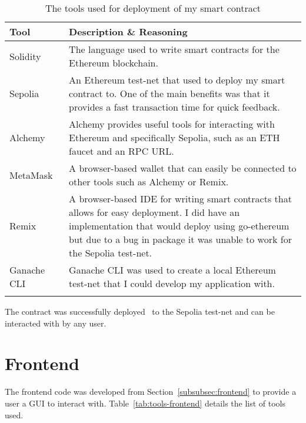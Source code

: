 \begin{longtable}{p{} p{}}
  \toprule
  \textbf{Tool} & \textbf{Description \& Reasoning}
  \\\midrule\midrule
  Solidity~\cite{noauthor_solidity_nodate}
  & The language used to write smart contracts for the Ethereum blockchain.\\
  Sepolia~\cite{noauthor_sepolia_nodate}
  & An Ethereum test-net that used to deploy my smart contract to. One of the main benefits was that it provides a fast transaction time for quick feedback.\\
  Alchemy~\cite{noauthor_alchemy_nodate}
  & Alchemy provides useful tools for interacting with Ethereum and specifically Sepolia, such as an ETH faucet and an RPC URL.\\
  MetaMask~\cite{noauthor_crypto_nodate}
  & A browser-based wallet that can easily be connected to other tools such as Alchemy or Remix.\\
  Remix~\cite{noauthor_remix_nodate}
  & A browser-based IDE for writing smart contracts that allows for easy deployment. I did have an implementation that would deploy using go-ethereum but due to a bug in package it was unable to work for the Sepolia test-net.
  \\
  Ganache CLI~\cite{noauthor_trufflesuiteganache_2023}
  & Ganache CLI was used to create a local Ethereum test-net that I could develop my application with.
  \\\bottomrule\bottomrule
  \caption{The tools used for deployment of my smart contract}
\end{longtable}

\vspace{2mm}\noindent
The contract was successfully deployed~\cite{etherscanio_deployed_nodate} to the Sepolia test-net and can be interacted with by any user.

\section{Frontend}

The frontend code was developed from Section~\ref{subsubsec:frontend} to provide a user a GUI to interact with. Table~\ref{tab:tools-frontend} details the list of tools used.

